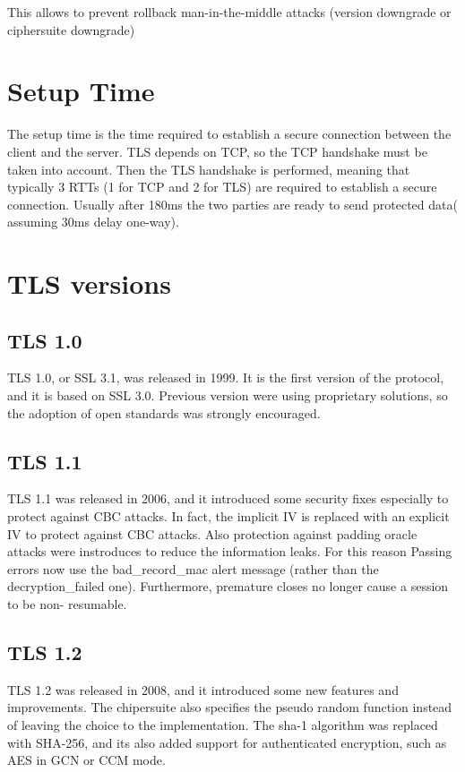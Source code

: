 \documentclass{report}
\begin{document}
This allows to prevent rollback man-in-the-middle attacks (version
downgrade or ciphersuite downgrade)

\section{Setup Time}
The setup time is the time required to establish a secure connection 
between the client and the server. TLS depends on TCP, so the TCP
handshake must be taken into account. Then the TLS handshake is
performed, meaning that typically 3 RTTs (1 for TCP and 2 for TLS) are
required to establish a secure connection. Usually after 180ms the two
parties are ready to send protected data( assuming 30ms delay
one-way).

\section{TLS versions}
\subsection{TLS 1.0}
TLS 1.0, or SSL 3.1, was released in 1999. It is the first version of
the protocol, and it is based on SSL 3.0. Previous version were using
proprietary solutions, so the adoption of open standards was strongly
encouraged.

\subsection{TLS 1.1}
TLS 1.1 was released in 2006, and it introduced some security fixes
especially to protect against CBC attacks. In fact, the implicit
IV is replaced with an explicit IV to protect against CBC attacks.
Also protection against padding oracle attacks were instroduces to
reduce the information leaks. For this reason Passing errors now use
the bad\_record\_mac alert message (rather than the decryption\_failed
one). Furthermore, premature closes no longer cause a session to be non-
resumable.

\subsection{TLS 1.2}
TLS 1.2 was released in 2008, and it introduced some new features and 
improvements. The chipersuite also specifies the pseudo random
function instead of leaving the choice to the implementation. The
sha-1 algorithm was replaced with SHA-256, and its also added support
for authenticated encryption, such as AES in GCN or CCM mode.
\end{document}

